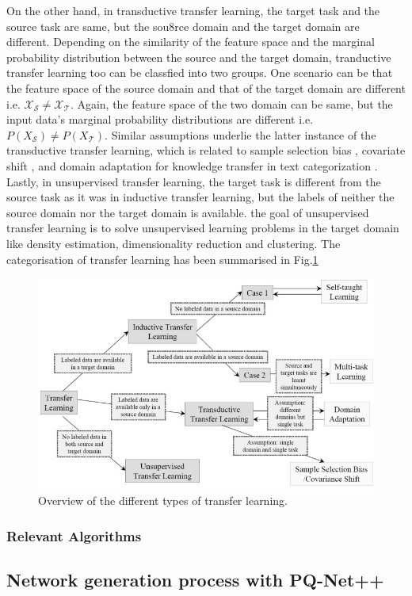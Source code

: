 On the other hand, in transductive transfer learning, the target task and the source task are same, but the sou8rce domain and the target domain are different. Depending on the similarity of the feature space and the marginal probability distribution between the source and the target domain, tranductive transfer learning too can be classfied into two groups. One scenario can be that the feature space of the source domain and that of the target domain are different i.e. $\mathcal{X_{\mathcal{S}}} \neq \mathcal{X_{\mathcal{T}}}$. Again, the feature space of the two domain can be same, but the input data's marginal probability distributions are different i.e. $P(X_{\mathcal{S}}) \neq P(X_{\mathcal{T}})$. Similar assumptions underlie the latter instance of the transductive transfer learning, which is related to sample selection bias \cite*{zadrozny2004learning}, covariate shift \cite*{shimodaira2000improving}, and domain adaptation for knowledge transfer in text categorization \cite*{daume2006domain,zadrozny2004learning}.\cite*{pan2009survey}
Lastly, in unsupervised transfer learning, the target task is different from the source task as it was in inductive transfer learning, but the labels of neither the source domain nor the target domain is available. the goal of unsupervised transfer learning is to solve unsupervised learning problems in the target domain like density estimation, dimensionality reduction and clustering\cite*{dai2008self,wang2008transferred}. The categorisation of transfer learning has been summarised in Fig.\ref*{fig:transfer_learning_overview}
\begin{figure}[t]
  \centering
  \includegraphics[width=350pt,height=200pt]{pictures/transfer_learning_types.PNG}
  \caption{Overview of the different types of transfer learning.\cite{pan2009survey}}
  \label{fig:transfer_learning_overview}
\end{figure} 
\subsubsection{Relevant Algorithms}
\subsection{Network generation process with PQ-Net++}

